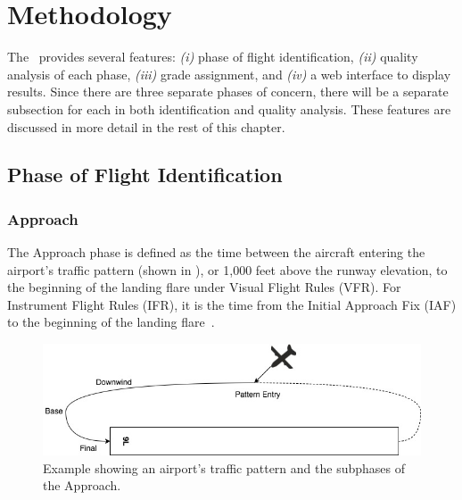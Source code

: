 \chapter{Methodology} \label{ch:methodology}

	The \toolname\ provides several features: \textit{(i)} phase of flight identification, \textit{(ii)} quality analysis of each phase, \textit{(iii)} grade assignment, and \textit{(iv)} a web interface to display results.  Since there are three separate phases of concern, there will be a separate subsection for each in both identification and quality analysis.  These features are discussed in more detail in the rest of this chapter.

\section{Phase of Flight Identification} \label{sec:phase_identification}


	\subsection{Approach}
    
    	The Approach phase is defined as the time between the aircraft entering the airport's traffic pattern (shown in ), or 1,000 feet above the runway elevation, to the beginning of the landing flare under Visual Flight Rules (VFR).  For Instrument Flight Rules (IFR), it is the time from the Initial Approach Fix (IAF) to the beginning of the landing flare~\cite{cictt2013phase}.
        
        \begin{figure}
        	\centering
            \includegraphics[width=\linewidth]{img/airport_traffic_pattern.jpg}
            \caption{Example showing an airport's traffic pattern and the subphases of the Approach.}
            \label{fig:traffic_pattern}
        \end{figure}
        
